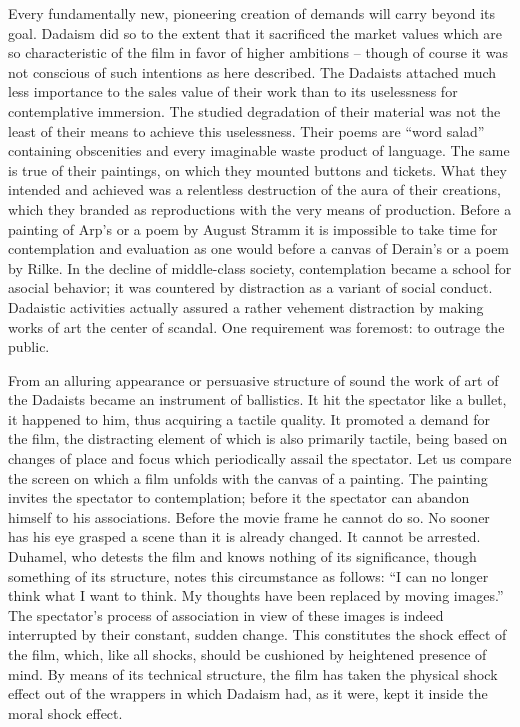 \documentclass[11pt, letterpaper]{article}
\begin{document}
Every fundamentally new, pioneering creation of demands will carry beyond its
goal. Dadaism did so to the extent that it sacrificed the market values which
are so characteristic of the film in favor of higher ambitions – though of
course it was not conscious of such intentions as here described. The Dadaists
attached much less importance to the sales value of their work than to its
uselessness for contemplative immersion. The studied degradation of their
material was not the least of their means to achieve this uselessness. Their
poems are “word salad” containing obscenities and every imaginable waste
product of language. The same is true of their paintings, on which they mounted
buttons and tickets. What they intended and achieved was a relentless
destruction of the aura of their creations, which they branded as reproductions
with the very means of production. Before a painting of Arp’s or a poem by
August Stramm it is impossible to take time for contemplation and evaluation as
one would before a canvas of Derain’s or a poem by Rilke. In the decline of
middle-class society, contemplation became a school for asocial behavior; it
was countered by distraction as a variant of social conduct. Dadaistic
activities actually assured a rather vehement distraction by making works of
art the center of scandal. One requirement was foremost: to outrage the public.

From an alluring appearance or persuasive structure of sound the work of art of
the Dadaists became an instrument of ballistics. It hit the spectator like a
bullet, it happened to him, thus acquiring a tactile quality. It promoted a
demand for the film, the distracting element of which is also primarily
tactile, being based on changes of place and focus which periodically assail
the spectator. Let us compare the screen on which a film unfolds with the
canvas of a painting. The painting invites the spectator to contemplation;
before it the spectator can abandon himself to his associations. Before the
movie frame he cannot do so. No sooner has his eye grasped a scene than it is
already changed. It cannot be arrested. Duhamel, who detests the film and knows
nothing of its significance, though something of its structure, notes this
circumstance as follows: “I can no longer think what I want to think. My
thoughts have been replaced by moving images.” The spectator’s process of
association in view of these images is indeed interrupted by their constant,
sudden change. This constitutes the shock effect of the film, which, like all
shocks, should be cushioned by heightened presence of mind. By means of its
technical structure, the film has taken the physical shock effect out of the
wrappers in which Dadaism had, as it were, kept it inside the moral shock
effect.
\end{document}
